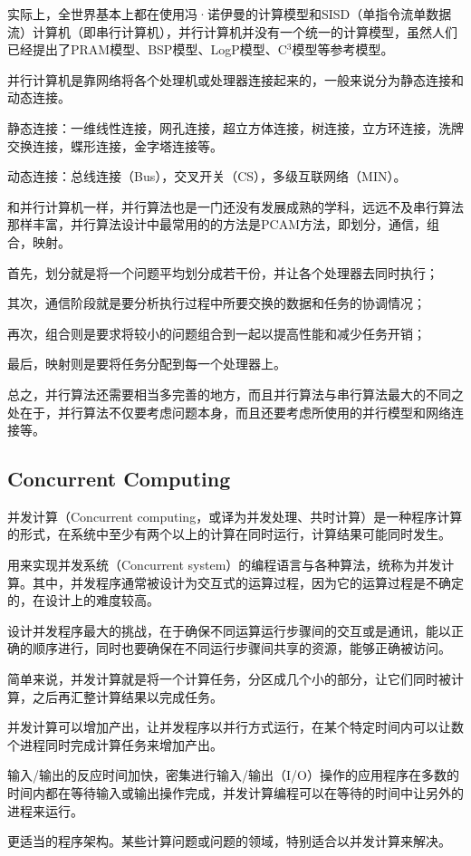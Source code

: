 实际上，全世界基本上都在使用冯·诺伊曼的计算模型和SISD（单指令流单数据流）计算机（即串行计算机），并行计算机并没有一个统一的计算模型，虽然人们已经提出了PRAM模型、BSP模型、LogP模型、C$^3$模型等参考模型。


并行计算机是靠网络将各个处理机或处理器连接起来的，一般来说分为静态连接和动态连接。

\begin{compactenum}
\item 静态连接：一维线性连接，网孔连接，超立方体连接，树连接，立方环连接，洗牌交换连接，蝶形连接，金字塔连接等。
\item 动态连接：总线连接（Bus），交叉开关（CS），多级互联网络（MIN）。
\end{compactenum}

和并行计算机一样，并行算法也是一门还没有发展成熟的学科，远远不及串行算法那样丰富，并行算法设计中最常用的的方法是PCAM方法，即划分，通信，组合，映射。

首先，划分就是将一个问题平均划分成若干份，并让各个处理器去同时执行；

其次，通信阶段就是要分析执行过程中所要交换的数据和任务的协调情况；

再次，组合则是要求将较小的问题组合到一起以提高性能和减少任务开销；

最后，映射则是要将任务分配到每一个处理器上。

总之，并行算法还需要相当多完善的地方，而且并行算法与串行算法最大的不同之处在于，并行算法不仅要考虑问题本身，而且还要考虑所使用的并行模型和网络连接等。



\subsection{Concurrent Computing}

并发计算（Concurrent computing，或译为并发处理、共时计算）是一种程序计算的形式，在系统中至少有两个以上的计算在同时运行，计算结果可能同时发生。

用来实现并发系统（Concurrent system）的编程语言与各种算法，统称为并发计算。其中，并发程序通常被设计为交互式的运算过程，因为它的运算过程是不确定的，在设计上的难度较高。

设计并发程序最大的挑战，在于确保不同运算运行步骤间的交互或是通讯，能以正确的顺序进行，同时也要确保在不同运行步骤间共享的资源，能够正确被访问。


简单来说，并发计算就是将一个计算任务，分区成几个小的部分，让它们同时被计算，之后再汇整计算结果以完成任务。

\begin{compactitem}
\item 并发计算可以增加产出，让并发程序以并行方式运行，在某个特定时间内可以让数个进程同时完成计算任务来增加产出。
\item 输入/输出的反应时间加快，密集进行输入/输出（I/O）操作的应用程序在多数的时间内都在等待输入或输出操作完成，并发计算编程可以在等待的时间中让另外的进程来运行。
\item 更适当的程序架构。某些计算问题或问题的领域，特别适合以并发计算来解决。
\end{compactitem}

